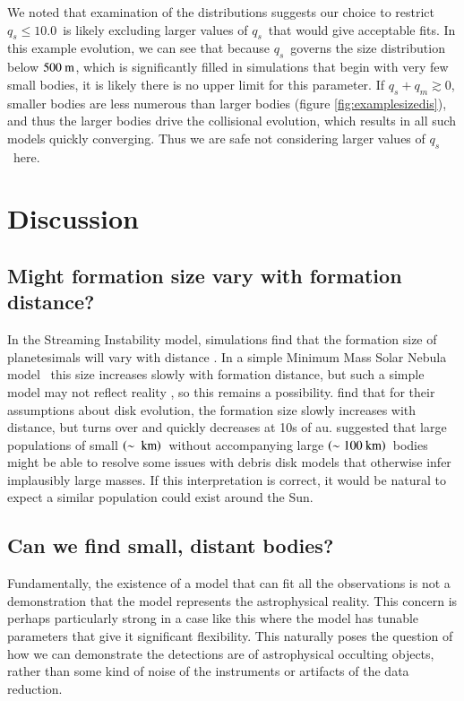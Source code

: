 \documentclass[printer]{aa}
\newcommand{\revised}{\color{black}}
\begin{document}
{We noted that examination of the distributions suggests our choice to restrict $q_s \leq 10.0$~is likely excluding larger values of $q_s$~that would give acceptable fits.  In this example evolution, we can see that because {\revised $q_s$}~governs the size distribution below $500~\rm{m}$, which is significantly filled in simulations that begin with very few small bodies, it is likely there is no upper limit for this parameter.  If $q_s + q_m \gtrsim 0$, smaller bodies are less numerous than larger bodies (figure \ref{fig:examplesizedis}), and thus the larger bodies drive the collisional evolution, which results in all such models quickly converging.  Thus we are safe not considering larger values of $q_s$~here.

\section{Discussion}

\label{sec:discussion}
\subsection{Might formation size vary with formation distance?}

In the Streaming Instability model, simulations find that the formation size of planetesimals will vary with distance \citep{2016ApJ...822...55S}.  In a simple Minimum Mass Solar Nebula model \citep{1977Ap&SS..51..153W}~this size increases slowly with formation distance, but such a simple model may not reflect reality \citep{2007ApJ...671..878D,2017ApJ...839...16C,2020ARA&A..58..483A}, so this remains a possibility.  \citet{2020ApJ...901...54K} find that for their assumptions about disk evolution, the formation size slowly increases with distance, but turns over and quickly decreases at 10s of au.  \citet{2021MNRAS.500..718K} suggested that large populations of small $\left( \sim~\rm{km} \right)$~without accompanying large $\left(\sim 100~\rm{km}\right)$~bodies might be able to resolve some issues with debris disk models that otherwise infer implausibly large masses.  If this interpretation is correct, it would be natural to expect a similar population could exist around the Sun.

\subsection{Can we find small, distant bodies?}

Fundamentally, the existence of a model that can fit all the observations is not a demonstration that the model represents the astrophysical reality.  This concern is perhaps particularly strong in a case like this where the model has tunable parameters that give it significant flexibility.  This naturally poses the question of how we can demonstrate the detections are of astrophysical occulting objects, rather than some kind of noise of the instruments or artifacts of the data reduction.

}
\end{document}
